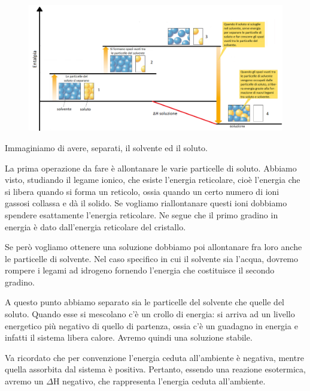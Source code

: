 \hspace{-0.2cm}\begin{figure}[H]
    \includegraphics[width=15.6cm]{immagini/entalpia_soluzioni.png}
\end{figure}

Immaginiamo di avere, separati, il solvente ed il soluto.

La prima operazione da fare è allontanare le varie particelle di soluto. Abbiamo visto, studiando il legame ionico, che esiste l'energia reticolare, cioè l'energia che si libera quando si forma un reticolo, ossia quando un certo numero di ioni gassosi collassa e dà il solido. Se vogliamo riallontanare questi ioni dobbiamo spendere esattamente l'energia reticolare. Ne segue che il primo gradino in energia è dato dall'energia reticolare del cristallo.

Se però vogliamo ottenere una soluzione dobbiamo poi allontanare fra loro anche le particelle di solvente. Nel caso specifico in cui il solvente sia l'acqua, dovremo rompere i legami ad idrogeno fornendo l'energia che costituisce il secondo gradino.

A questo punto abbiamo separato sia le particelle del solvente che quelle del soluto. Quando esse si mescolano c'è un crollo di energia: si arriva ad un livello energetico più negativo di quello di partenza, ossia c'è un guadagno in energia e infatti il sistema libera calore. Avremo quindi una soluzione stabile.

Va ricordato che per convenzione l'energia ceduta all'ambiente è negativa, mentre quella assorbita dal sistema è positiva. Pertanto, essendo una reazione esotermica, avremo un $\Delta$H negativo, che rappresenta l'energia ceduta all'ambiente.
